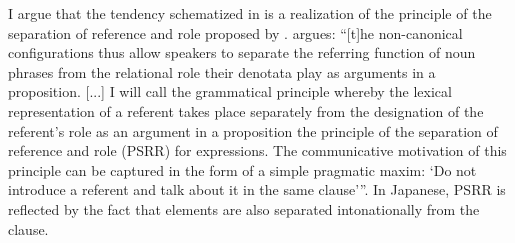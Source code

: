 %

I argue that the tendency schematized in \Last is a realization
of the principle of the separation of reference and role proposed by
.
 argues:
``[t]he non-canonical configurations thus allow speakers to separate the {\sc referring} function of noun phrases from the {\sc relational} role their denotata play as arguments in a proposition. [...]
I will call the grammatical principle whereby the lexical representation of a  referent takes place separately from the designation of the referent's role as an argument in a proposition the {\sc principle of the separation of reference and role} (PSRR) for  expressions. The communicative motivation of this principle can be captured in the form of a simple pragmatic maxim:
`Do not introduce a referent and talk about it in the same clause'''.
In Japanese,
PSRR is reflected by the fact that
 elements are also separated intonationally from the clause.



